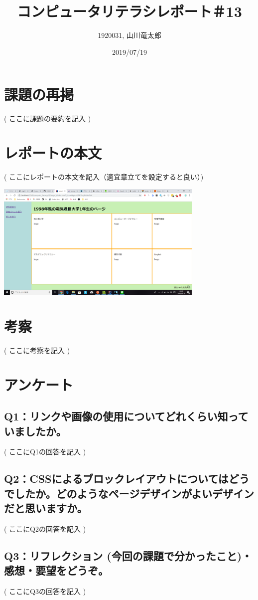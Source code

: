 \documentclass[12pt,a4j]{jarticle}
\begin{document}
\title{コンピュータリテラシレポート＃13}
\author{1920031, 山川竜太郎}
\date{2019/07/19}
\maketitle


\section{課題の再掲}
( ここに課題の要約を記入 )

\section{レポートの本文}
( ここにレポートの本文を記入（適宜章立てを設定すると良い）)

\begin{center}
  \includegraphics[width=10cm]{./ensyu_3/image.png}
\end{center}

\section{考察}
( ここに考察を記入 )

\section{アンケート}

\subsection{Q1：リンクや画像の使用についてどれくらい知っていましたか。}
( ここにQ1の回答を記入 )

\subsection{Q2：CSSによるブロックレイアウトについてはどうでしたか。どのようなページデザインがよいデザインだと思いますか。}
( ここにQ2の回答を記入 )

\subsection{Q3：リフレクション (今回の課題で分かったこと)・感想・要望をどうぞ。}
( ここにQ3の回答を記入 )
\end{document}

